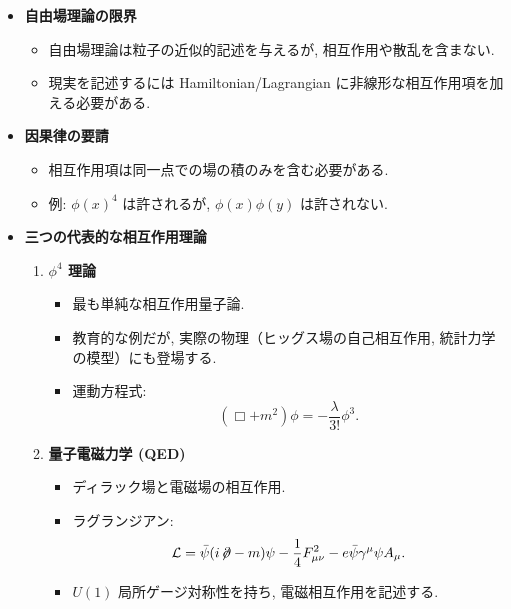 \documentclass[a4paper,12pt]{article}
\begin{document}
\begin{itemize}
  \item \textbf{自由場理論の限界}
  \begin{itemize}
    \item 自由場理論は粒子の近似的記述を与えるが, 相互作用や散乱を含まない.
    \item 現実を記述するには Hamiltonian/Lagrangian に非線形な相互作用項を加える必要がある.
  \end{itemize}

  \item \textbf{因果律の要請}
  \begin{itemize}
    \item 相互作用項は同一点での場の積のみを含む必要がある.
    \item 例: $\phi(x)^4$ は許されるが, $\phi(x)\phi(y)$ は許されない.
  \end{itemize}

  \item \textbf{三つの代表的な相互作用理論}
  \begin{enumerate}
    \item \textbf{$\phi^4$ 理論}
    \begin{itemize}
      \item 最も単純な相互作用量子論.
      \item 教育的な例だが, 実際の物理（ヒッグス場の自己相互作用, 統計力学の模型）にも登場する.
      \item 運動方程式:
      \begin{equation*}
        (\Box + m^2)\phi = -\frac{\lambda}{3!}\phi^3 .
      \end{equation*}
    \end{itemize}

    \item \textbf{量子電磁力学 (QED)}
    \begin{itemize}
      \item ディラック場と電磁場の相互作用.
      \item ラグランジアン:
      \begin{equation*}
        \mathcal{L} = \bar{\psi}(i\!\not\!\partial - m)\psi
        - \frac{1}{4}F_{\mu\nu}^2
        - e \bar{\psi}\gamma^\mu \psi A_\mu .
      \end{equation*}
      \item $U(1)$ 局所ゲージ対称性を持ち, 電磁相互作用を記述する.
    \end{itemize}


\end{enumerate}
\end{itemize}
\end{document}
